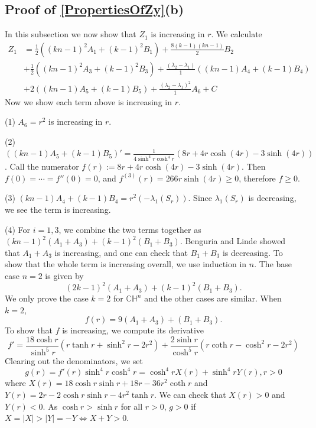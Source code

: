 \documentclass{amsart}
\numberwithin{equation}{section}
\theoremstyle{plain}
\theoremstyle{definition}
\theoremstyle{remark}
\def\CC {\mathbb{C}}
\def\HH {\mathbb{H}}
\newcommand{\abs}[1]{\left\lvert #1 \right\rvert}  %
\begin{document}
\subsection{Proof of \cref{PropertiesOfZy}(b) }
In this subsection we now show that $Z_1$ is increasing in $r$. We calculate
\begin{align*}
    Z_1 &=\frac{1}{2}((kn-1)^2 A_1+(k-1)^2 B_1)+\frac{8(k-1)(k n-1)}{2}B_2 \\
        &+\frac{1}{2}((kn-1)^2 A_3+(k-1)^2 B_3)+\frac{(\lambda_2-\lambda_1)}{1}((kn-1)A_4+(k-1)B_4)\\
        &+2((kn-1)A_5+(k-1)B_5)+\frac{(\lambda_2-\lambda_1)^2}{1}A_6+ C 
\end{align*}
Now we show each term above is increasing in $r$.
\par (1) $A_6= r^2$ is increasing in $r$.
\par (2) $((kn-1)A_5+(k-1)B_5)'=\frac{1}{4 \sinh^4 r \cosh^4 r}(8 r+4 r \cosh (4 r)-3 \sinh (4 r))$.
Call the numerator $f(r):=8 r+4 r \cosh (4 r)-3 \sinh (4 r)$. Then $f(0)=\cdots=f''(0)=0$, and $f^{(3)}(r)=266 r \sinh (4 r) \geqslant 0$, therefore $f\geq 0$.
\par (3) $(kn-1)A_4+(k-1)B_4 = r^2\left(-\lambda_1(S_r)\right)$. Since $\lambda_1(S_r)$ is decreasing, we see the term is increasing.
\par (4) For $i=1,3$, we combine the two terms together as $(k n-1)^2\left(A_1+A_3\right)+(k-1)^2\left(B_1+B_3\right)$. Benguria and Linde \cite{benguria2007second} showed that $A_1+A_3$ is increasing, and one can check that $B_1+B_3$ is decreasing. To show that the whole term is increasing overall, we use induction in $n$. The base case $n=2$ is given by
\[(2k-1)^2 (A_1+A_3)+ (k-1)^2 (B_1+B_3).\] We only prove the case $k=2$ for $\CC\HH^n$ and the other cases are similar. When $k=2$, \[f(r)= 9(A_1+A_3)+  (B_1+B_3).\] To show that $f$ is increasing, we compute its derivative 
\[f' = \frac{18\cosh{r}}{\sinh^5{r}}(r \tanh r+\sinh ^2 r-2 r^2)+\frac{2\sinh{r}}{\cosh^5{r}}(r \coth r-\cosh^2 r-2 r^2)\]
Clearing out the denominators, we set
\[ g(r) = f'(r)\sinh^4{r}\cosh^4{r}= \cosh^4{r}X(r)+\sinh^4{r} Y(r), r>0\]
where $X(r)= 18\cosh{r}\sinh r+18r-36r^2\coth r$ and $Y(r)= 2r-2\cosh{r}\sinh r-4r^2 \tanh r$. We can check that $X(r)>0$ and $Y(r)<0$. As $\cosh r>\sinh r$ for all $r>0$, $g>0$ if $X= |X|> \abs{Y}= -Y \Longleftrightarrow X+Y>0$. 
\end{document}
